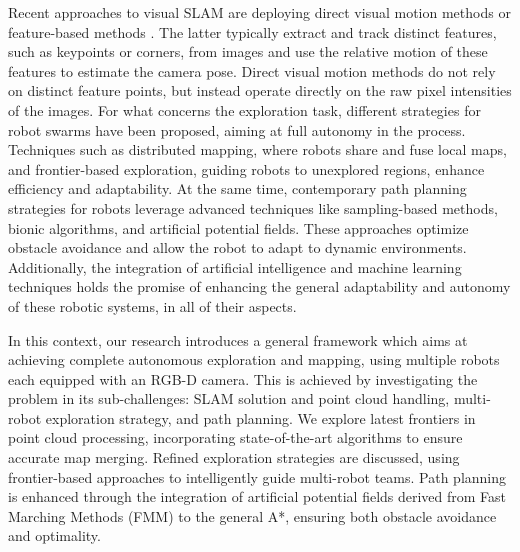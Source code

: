 Recent approaches to visual SLAM are deploying direct visual motion methods or feature-based methods \cite{macario2022comprehensive}. The latter typically extract and track distinct features, such as keypoints or corners, from images and use the relative motion of these features to estimate the camera pose. Direct visual motion methods do not rely on distinct feature points, but instead operate directly on the raw pixel intensities of the images. 
For what concerns the exploration task, different strategies for robot swarms have been proposed, aiming at full autonomy in the process. Techniques such as distributed mapping, where robots share and fuse local maps, and frontier-based exploration, guiding robots to unexplored regions, enhance efficiency and adaptability. 
At the same time, contemporary path planning strategies for robots leverage advanced techniques like sampling-based methods, bionic algorithms, and artificial potential fields. These approaches optimize obstacle avoidance and allow the robot to adapt to dynamic environments.
Additionally, the integration of artificial intelligence and machine learning techniques holds the promise of enhancing the general adaptability and autonomy of these robotic systems, in all of their aspects.


In this context, our research introduces a general framework which aims at achieving complete autonomous exploration and mapping, using multiple robots each equipped with an RGB-D camera. This is achieved by investigating the problem in its sub-challenges: SLAM solution and point cloud handling, multi-robot exploration strategy, and path planning.
We explore latest frontiers in point cloud processing, incorporating state-of-the-art algorithms to ensure accurate map merging. Refined exploration strategies are discussed, using frontier-based approaches to intelligently guide multi-robot teams. Path planning is enhanced through the integration of artificial potential fields derived from Fast Marching Methods (FMM) to the general A*, ensuring both obstacle avoidance and optimality.


